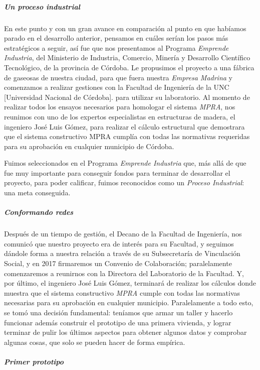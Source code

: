 \documentclass[
]{article}
\begin{document}
\hypertarget{un-proceso-industrial}{%
\subparagraph{Un proceso industrial}\label{un-proceso-industrial}}

En este punto y con un gran avance en comparación al punto en que
habíamos parado en el desarrollo anterior, pensamos en cuáles serían los
pasos más estratégicos a seguir, así fue que nos presentamos al Programa
\emph{Emprende Industria}, del Ministerio de Industria, Comercio,
Minería y Desarrollo Científico Tecnológico, de la provincia de Córdoba.
Le propusimos el proyecto a una fábrica de gaseosas de nuestra ciudad,
para que fuera nuestra \emph{Empresa Madrina} y comenzamos a realizar
gestiones con la Facultad de Ingeniería de la UNC {[}Universidad
Nacional de Córdoba{]}. para utilizar su laboratorio. Al momento de
realizar todos los ensayos necesarios para homologar el sistema
\emph{MPRA}, nos reunimos con uno de los expertos especialistas en
estructuras de madera, el ingeniero José Luis Gómez, para realizar el
cálculo estructural que demostrara que el sistema constructivo MPRA
cumplía con todas las normativas requeridas para su aprobación en
cualquier municipio de Córdoba.

Fuimos seleccionados en el Programa \emph{Emprende Industria} que, más
allá de que fue muy importante para conseguir fondos para terminar de
desarrollar el proyecto, para poder calificar, fuimos reconocidos como
un \emph{Proceso Industrial}: una meta conseguida.

\hypertarget{conformando-redes}{%
\subparagraph{Conformando redes}\label{conformando-redes}}

Después de un tiempo de gestión, el Decano de la Facultad de Ingeniería,
nos comunicó que nuestro proyecto era de interés para su Facultad, y
seguimos dándole forma a nuestra relación a través de su Subsecretaría
de Vinculación Social, y en 2017 firmaremos un Convenio de Colaboración;
paralelamente comenzaremos a reunirnos con la Directora del Laboratorio
de la Facultad. Y, por último, el ingeniero José Luis Gómez, terminará
de realizar los cálculos donde muestra que el sistema constructivo
\emph{MPRA} cumple con todas las normativas necesarias para su
aprobación en cualquier municipio. Paralelamente a todo esto, se tomó
una decisión fundamental: teníamos que armar un taller y hacerlo
funcionar además construir el prototipo de una primera vivienda, y
lograr terminar de pulir los últimos aspectos para obtener algunos datos
y comprobar algunas cosas, que solo se pueden hacer de forma empírica.

\hypertarget{primer-prototipo}{%
\subparagraph{Primer prototipo}\label{primer-prototipo}}
\end{document}
